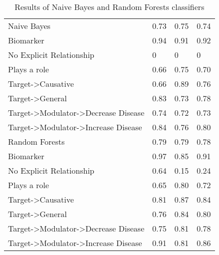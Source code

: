 \documentclass[final,12pt,3p,times,twocolumn,authoryear]{elsarticle}
\begin{document}
\begin{table*}[!]
\begin{tabular}{|l|l|l|l|}
        \hspace*{3mm} Naive Bayes &  0.73 & 0.75 & 0.74 \\
        \hspace*{6mm} Biomarker & 0.94 & 0.91 & 0.92 \\
        \hspace*{6mm} No Explicit Relationship   & 0 & 0 & 0 \\
        \hspace*{6mm} Plays a role & 0.66 & 0.75 & 0.70 \\ 
        \hspace*{6mm} Target-\textgreater Causative  & 0.66 & 0.89 & 0.76\\
        \hspace*{6mm} Target-\textgreater General        & 0.83 & 0.73 & 0.78 \\
        \hspace*{6mm} Target-\textgreater Modulator-\textgreater Decrease Disease & 0.74 & 0.72 & 0.73 \\
        \hspace*{6mm} Target-\textgreater Modulator-\textgreater Increase Disease   &0.84 & 0.76 & 0.80 \\ 
        \hline
        \hspace*{3mm} Random Forests &  0.79 & 0.79 & 0.78  \\
        \hspace*{6mm} Biomarker & 0.97 & 0.85 & 0.91 \\  
        \hspace*{6mm} No Explicit Relationship   & 0.64 & 0.15 & 0.24  \\
        \hspace*{6mm} Plays a role & 0.65 & 0.80 & 0.72 \\
        \hspace*{6mm} Target-\textgreater Causative  & 0.81 & 0.87 & 0.84 \\
        \hspace*{6mm} Target-\textgreater General        & 0.76 & 0.84 & 0.80\\ 
        \hspace*{6mm} Target-\textgreater Modulator-\textgreater Decrease Disease & 0.75 & 0.81 & 0.78 \\  
        \hspace*{6mm} Target-\textgreater Modulator-\textgreater Increase Disease   &0.91  & 0.81 & 0.86 \\
        \hline
    \end{tabular}
    \caption{Results of Naive Bayes and Random Forests classifiers}
    \label{tab:trad_res}
\end{table*}
\end{document}
